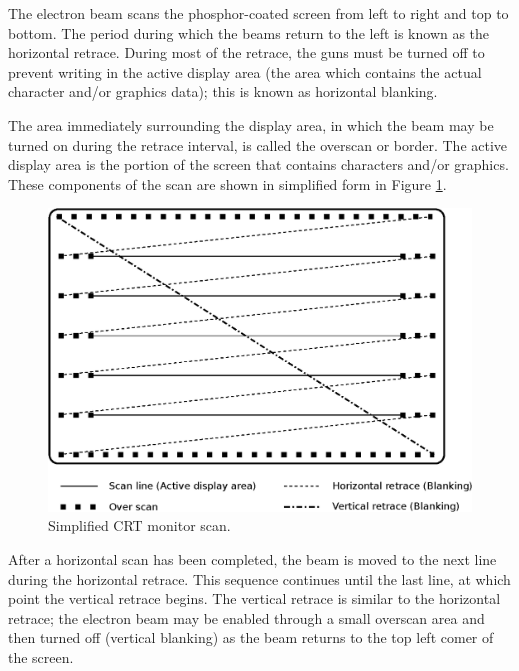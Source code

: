 \documentclass[book.tex]{subfiles}
\begin{document}
The electron beam scans the phosphor-coated screen from left to right and
top to bottom. The period during which the beams return to the left is known as
the horizontal retrace. During most of the retrace, the guns must be turned off
to prevent writing in the active display area (the area which contains the actual
character and/or graphics data); this is known as horizontal blanking.\\

\par
The area immediately surrounding the display area, in which the beam may be turned on
during the retrace interval, is called the overscan or border. The active display
area is the portion of the screen that contains characters and/or graphics. These
components of the scan are shown in simplified form in Figure \ref{fig:monitor}.\\

\begin{figure}[H]
\centering
\includegraphics[width=\textwidth]{imgs/drawings/monitor.eps}
\caption{Simplified CRT monitor scan.}
\label{fig:monitor}
\end{figure}

\par
After a horizontal scan has been completed, the beam is moved to the next
line during the horizontal retrace. This sequence continues until the last line, at which point the vertical retrace begins. The vertical retrace is similar to the horizontal retrace; the electron beam may be enabled through a small overscan area and then turned off (vertical blanking) as the beam returns to the top left comer of the screen.\\
\end{document}
